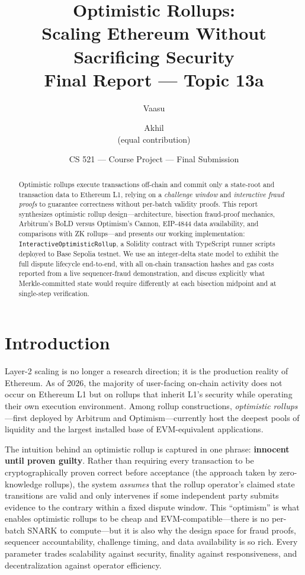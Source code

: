 \documentclass[11pt,letterpaper]{article}
\title{%
    \vspace{-1cm}%
    \LARGE\bfseries Optimistic Rollups:\\
    \Large Scaling Ethereum Without Sacrificing Security\\[0.4em]
    \normalsize\mdseries Final Report --- Topic 13a
}
\author{Vaasu \and Akhil \\ \small (equal contribution)}
\date{CS 521 --- Course Project --- Final Submission}
\begin{document}

\maketitle
\thispagestyle{fancy}

\begin{abstract}
Optimistic rollups execute transactions off-chain and commit only a state-root and transaction data to Ethereum L1, relying on a \emph{challenge window} and \emph{interactive fraud proofs} to guarantee correctness without per-batch validity proofs. This report synthesizes optimistic rollup design---architecture, bisection fraud-proof mechanics, Arbitrum's BoLD versus Optimism's Cannon, EIP-4844 data availability, and comparisons with ZK rollups---and presents our working implementation: \texttt{InteractiveOptimisticRollup}, a Solidity contract with TypeScript runner scripts deployed to Base Sepolia testnet. We use an integer-delta state model to exhibit the full dispute lifecycle end-to-end, with all on-chain transaction hashes and gas costs reported from a live sequencer-fraud demonstration, and discuss explicitly what Merkle-committed state would require differently at each bisection midpoint and at single-step verification.
\end{abstract}

\section{Introduction}

Layer-2 scaling is no longer a research direction; it is the production reality of Ethereum. As of 2026, the majority of user-facing on-chain activity does not occur on Ethereum L1 but on rollups that inherit L1's security while operating their own execution environment. Among rollup constructions, \emph{optimistic rollups}---first deployed by Arbitrum and Optimism---currently host the deepest pools of liquidity and the largest installed base of EVM-equivalent applications.

The intuition behind an optimistic rollup is captured in one phrase: \textbf{innocent until proven guilty}. Rather than requiring every transaction to be cryptographically proven correct before acceptance (the approach taken by zero-knowledge rollups), the system \emph{assumes} that the rollup operator's claimed state transitions are valid and only intervenes if some independent party submits evidence to the contrary within a fixed dispute window. This ``optimism'' is what enables optimistic rollups to be cheap and EVM-compatible---there is no per-batch SNARK to compute---but it is also why the design space for fraud proofs, sequencer accountability, challenge timing, and data availability is so rich. Every parameter trades scalability against security, finality against responsiveness, and decentralization against operator efficiency.
\end{document}
